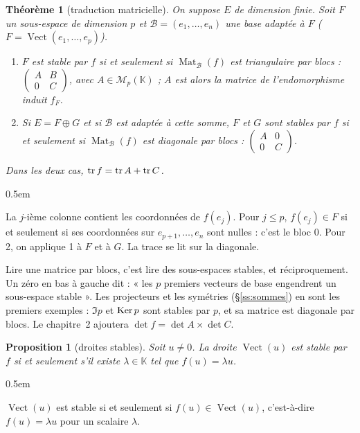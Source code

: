 \documentclass[a4paper,11pt]{article}
\makeatletter
\numberwithin{equation}{section}
\numberwithin{figure}{section}
\numberwithin{table}{section}
\theoremstyle{enonce}
\newtheorem{theoreme}[definition]{Théorème}
\newtheorem{proposition}[definition]{Proposition}
\theoremstyle{exemple}
\theoremstyle{remarque}
\renewcommand{\proofname}{Démonstration}
\renewenvironment{proof}[1][\proofname]{\par\pushQED{\qed}\normalfont
  \topsep0.5em\relax\trivlist\item[\hskip\labelsep\sffamily\itshape\color{Gris}#1.]\ignorespaces}
  {\popQED\endtrivlist\@endpefalse}
\newcommand{\K}{\mathbb{K}}
\newcommand{\vect}{\operatorname{Vect}}
\newcommand{\Mat}{\operatorname{Mat}}
\makeatother
\begin{document}
\begin{theoreme}[traduction matricielle]\label{t:blocs}
On suppose $E$ de dimension finie. Soit $F$ un sous-espace de dimension $p$ et $\mathcal B=(e_1,\dots,e_n)$ une base adaptée à $F$
($F=\vect(e_1,\dots,e_p)$).
\begin{enumerate}
\item $F$ est stable par $f$ si et seulement si $\Mat_{\mathcal B}(f)$ est triangulaire par blocs :
$\begin{pmatrix}A&B\\0&C\end{pmatrix}$, avec $A\in\mathcal M_p(\K)$ ; $A$ est alors la matrice de l'endomorphisme induit $f_F$.
\item Si $E=F\oplus G$ et si $\mathcal B$ est adaptée à cette somme, $F$ et $G$ sont stables par $f$ si et seulement si
$\Mat_{\mathcal B}(f)$ est diagonale par blocs : $\begin{pmatrix}A&0\\0&C\end{pmatrix}$.
\end{enumerate}
Dans les deux cas, $\operatorname{tr} f=\operatorname{tr} A+\operatorname{tr} C$.
\end{theoreme}

\begin{proof}
La $j$-ième colonne contient les coordonnées de $f(e_j)$. Pour $j\leq p$, $f(e_j)\in F$ si et seulement si ses coordonnées sur
$e_{p+1},\dots,e_n$ sont nulles : c'est le bloc $0$. Pour 2, on applique 1 à $F$ et à $G$. La trace se lit sur la diagonale.
\end{proof}

\begin{enpratique}
Lire une matrice par blocs, c'est lire des sous-espaces stables, et réciproquement. Un zéro en bas à gauche dit : « les $p$
premiers vecteurs de base engendrent un sous-espace stable ». Les projecteurs et les symétries (§\ref{ss:sommes}) en sont les
premiers exemples : $\Im p$ et $\operatorname{Ker} p$ sont stables par $p$, et sa matrice est diagonale par blocs. Le chapitre~2 ajoutera
$\det f=\det A\times\det C$.
\end{enpratique}

\begin{proposition}[droites stables]\label{p:droite}
Soit $u\neq0$. La droite $\vect(u)$ est stable par $f$ si et seulement s'il existe $\lambda\in\K$ tel que $f(u)=\lambda u$.
\end{proposition}

\begin{proof}
$\vect(u)$ est stable si et seulement si $f(u)\in\vect(u)$, c'est-à-dire $f(u)=\lambda u$ pour un scalaire $\lambda$.
\end{proof}
\end{document}
